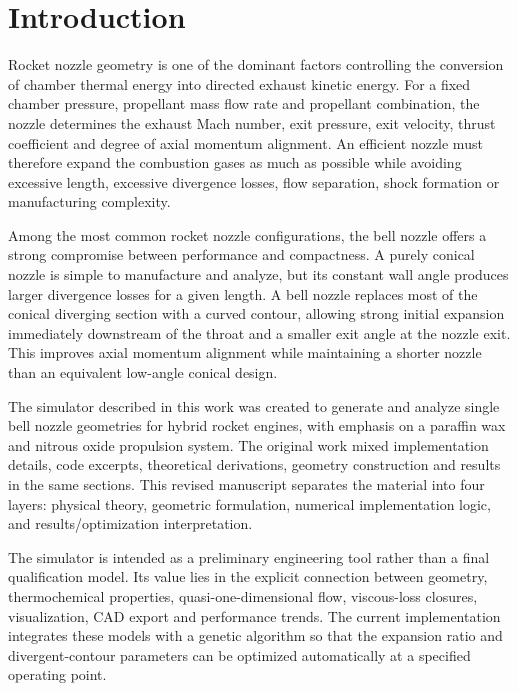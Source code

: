 \section{Introduction}

Rocket nozzle geometry is one of the dominant factors controlling the conversion of chamber thermal energy into directed exhaust kinetic energy. For a fixed chamber pressure, propellant mass flow rate and propellant combination, the nozzle determines the exhaust Mach number, exit pressure, exit velocity, thrust coefficient and degree of axial momentum alignment. An efficient nozzle must therefore expand the combustion gases as much as possible while avoiding excessive length, excessive divergence losses, flow separation, shock formation or manufacturing complexity.

Among the most common rocket nozzle configurations, the bell nozzle offers a strong compromise between performance and compactness. A purely conical nozzle is simple to manufacture and analyze, but its constant wall angle produces larger divergence losses for a given length. A bell nozzle replaces most of the conical diverging section with a curved contour, allowing strong initial expansion immediately downstream of the throat and a smaller exit angle at the nozzle exit. This improves axial momentum alignment while maintaining a shorter nozzle than an equivalent low-angle conical design.

The simulator described in this work was created to generate and analyze single bell nozzle geometries for hybrid rocket engines, with emphasis on a paraffin wax and nitrous oxide propulsion system. The original work mixed implementation details, code excerpts, theoretical derivations, geometry construction and results in the same sections. This revised manuscript separates the material into four layers: physical theory, geometric formulation, numerical implementation logic, and results/optimization interpretation.

The simulator is intended as a preliminary engineering tool rather than a final qualification model. Its value lies in the explicit connection between geometry, thermochemical properties, quasi-one-dimensional flow, viscous-loss closures, visualization, CAD export and performance trends. The current implementation integrates these models with a genetic algorithm so that the expansion ratio and divergent-contour parameters can be optimized automatically at a specified operating point.
